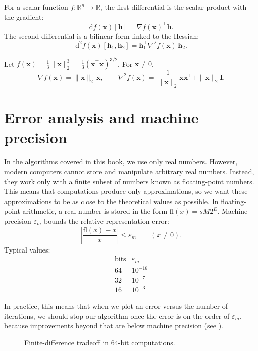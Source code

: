 \noindent For a scalar function $f:\mathbb{R}^n\to\mathbb{R}$, 
the first differential is the scalar product with the gradient:
\[
  \mathrm{d} f(\mathbf{x})[\mathbf{h}]=\nabla f(\mathbf{x})^\top \mathbf{h}.
\]
The second differential is a bilinear form linked to the Hessian:
\[
  \mathrm{d}^2 f(\mathbf{x})[\mathbf{h}_1,\mathbf{h}_2]=
  \mathbf{h}_1^\top \nabla^2 f(\mathbf{x})\,\mathbf{h}_2.
\]

\begin{example}[A worked example: $f(\mathbf{x})=\frac{1}{3}\|\mathbf{x}\|_2^3$]
Let $f(\mathbf{x})=\frac{1}{3}\|\mathbf{x}\|_2^3=\frac{1}{3}(\mathbf{x}^\top \mathbf{x})^{3/2}$.
For $\mathbf{x}\neq 0$,
\[
  \nabla f(\mathbf{x})=\|\mathbf{x}\|_2\,\mathbf{x},
  \qquad
  \nabla^2 f(\mathbf{x})=\frac{1}{\|\mathbf{x}\|_2}\mathbf{x}\mathbf{x}^\top
  +\|\mathbf{x}\|_2 \mathbf{I}.
\]
\end{example}

\section{Error analysis and machine precision}

In the algorithms covered in this book, we use only real numbers. However, modern
computers cannot store and manipulate arbitrary real numbers. Instead, they work only
with a finite subset of numbers known as floating-point numbers. This means that
computations produce only approximations, so we want these approximations to be as
close to the theoretical values as possible. In floating-point arithmetic, a real number is
stored in the form $\mathrm{fl}(x)=sM2^E$. Machine precision $\varepsilon_m$ bounds the
relative representation error:
\[
\left|\frac{\mathrm{fl}(x)-x}{x}\right| \leq \varepsilon_m\qquad (x\neq 0).
\]
Typical values:
\[
\begin{array}{c|c}
\text{bits} & \varepsilon_m \\
\hline
64 & 10^{-16} \\
32 & 10^{-7} \\
16 & 10^{-3}
\end{array}
\]

\noindent In practice, this means that when we plot an error versus the number of
iterations, we should stop our algorithm once the error is on the order of $\varepsilon_m$,
because improvements beyond that are below machine precision (see ).
\begin{figure}[ht]
    \centering
    \caption{Finite-difference tradeoff in 64-bit computations.}
    \label{fig:finite-difference-tradeoff}
\end{figure}
